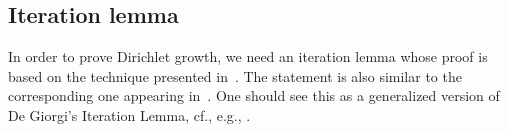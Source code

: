 % 
% 
% 
% 



\subsection{Iteration lemma}

In order to prove Dirichlet growth, we need an iteration lemma
whose proof is based on the technique presented in~\cite[\href{http://www.math.ucla.edu/~tao/254a.1.01w/notes4.dvi}{notes4}, p.~11]{TaoLectures}.
The statement is also similar to the corresponding one appearing in~\cite{DR11Sphere}.
One should see this as a generalized version of De Giorgi's Iteration Lemma, cf., e.g., \cite{GiaquintaMI}.

